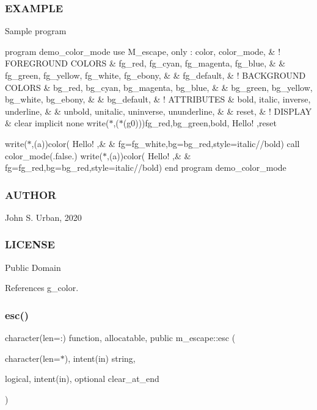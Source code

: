 \subsubsection*{E\+X\+A\+M\+P\+LE}

Sample program

program demo\+\_\+color\+\_\+mode use M\+\_\+escape, only \+: color, color\+\_\+mode, \& ! F\+O\+R\+E\+G\+R\+O\+U\+ND C\+O\+L\+O\+RS \& fg\+\_\+red, fg\+\_\+cyan, fg\+\_\+magenta, fg\+\_\+blue, \& \& fg\+\_\+green, fg\+\_\+yellow, fg\+\_\+white, fg\+\_\+ebony, \& \& fg\+\_\+default, \& ! B\+A\+C\+K\+G\+R\+O\+U\+ND C\+O\+L\+O\+RS \& bg\+\_\+red, bg\+\_\+cyan, bg\+\_\+magenta, bg\+\_\+blue, \& \& bg\+\_\+green, bg\+\_\+yellow, bg\+\_\+white, bg\+\_\+ebony, \& \& bg\+\_\+default, \& ! A\+T\+T\+R\+I\+B\+U\+T\+ES \& bold, italic, inverse, underline, \& \& unbold, unitalic, uninverse, ununderline, \& \& reset, \& ! D\+I\+S\+P\+L\+AY \& clear implicit none write($\ast$,\textquotesingle{}($\ast$(g0))\textquotesingle{})fg\+\_\+red,bg\+\_\+green,bold,\textquotesingle{} Hello! \textquotesingle{},reset

write($\ast$,\textquotesingle{}(a)\textquotesingle{})color(\textquotesingle{} Hello! \textquotesingle{},\& \& fg=fg\+\_\+white,bg=bg\+\_\+red,style=italic//bold) call color\+\_\+mode(.false.) write($\ast$,\textquotesingle{}(a)\textquotesingle{})color(\textquotesingle{} Hello! \textquotesingle{},\& \& fg=fg\+\_\+red,bg=bg\+\_\+red,style=italic//bold) end program demo\+\_\+color\+\_\+mode

\subsubsection*{A\+U\+T\+H\+OR}

John S. Urban, 2020 \subsubsection*{L\+I\+C\+E\+N\+SE}

Public Domain 

References g\+\_\+color.

\mbox{\label{namespacem__escape_a36f016baad6b23f86189e6f3ee6db0cb}} 
\subsubsection{\texorpdfstring{esc()}{esc()}}
{\footnotesize\ttfamily character(len=\+:) function, allocatable, public m\+\_\+escape\+::esc (\begin{DoxyParamCaption}\item[{character(len=$\ast$), intent(in)}]{string,  }\item[{logical, intent(in), optional}]{clear\+\_\+at\+\_\+end }\end{DoxyParamCaption})}



